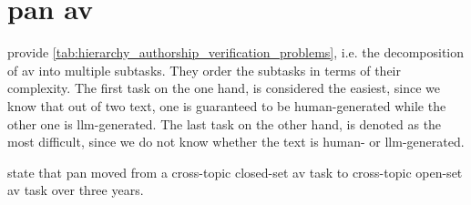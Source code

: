 \section{\acs{pan} \ac{av}}
\label{sec:pan_authorship_verification}

\citet{ayele_overview_2024} provide \autoref{tab:hierarchy_authorship_verification_problems}, i.e. 
the decomposition of \ac{av} into multiple subtasks. 
They order the subtasks in terms of their complexity.
The first task on the one hand, is considered the easiest, since we know that out of two text, one is guaranteed to be human-generated while the other one is \ac{llm}-generated.
The last task on the other hand, is denoted as the most difficult, since we do not know whether the text is human- or \ac{llm}-generated.


\begin{table}[tbp]
    \centering
    \caption{Hierarchy of \ac{av} problems \citep{ayele_overview_2024,bevendorff_overview_2024} from easiest (1) to most difficult (7), 
    where A, B corresponds to human-authored text and M denotes \ac{llm}-generated text.}
    \label{tab:hierarchy_authorship_verification_problems}
\end{table}

\citet{boenninghoff_o2d2_2021} state that \ac{pan} moved from a cross-topic closed-set \ac{av} task 
to cross-topic open-set \ac{av} task over three years.

